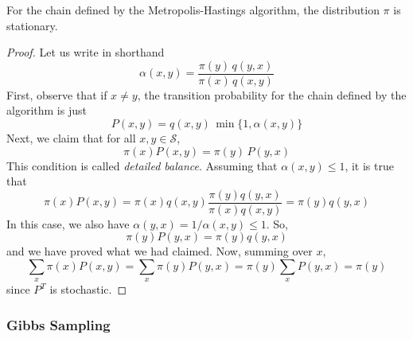 \documentclass{article}
\begin{document}
      \begin{proposition}
        For the chain defined by the Metropolis-Hastings algorithm, the distribution $\pi$ is stationary. 
      \end{proposition}
      \begin{proof}
        Let us write in shorthand 
        \begin{equation}
          \alpha(x, y) = \frac{\pi(y)\, q(y, x)}{\pi(x)\, q(x, y)}
        \end{equation}
        First, observe that if $x \neq y$, the transition probability for the chain defined by the algorithm is just
        \begin{equation}
          P(x, y) = q(x, y)\, \min\{1, \alpha(x, y)\}
        \end{equation}
        Next, we claim that for all $x, y \in \mathcal{S}$, 
        \begin{equation}
          \pi(x) P(x, y) = \pi(y) \, P(y, x)
        \end{equation}
        This condition is called \textit{detailed balance}. Assuming that $\alpha(x, y) \leq 1$, it is true that
        \begin{equation}
          \pi(x) P(x, y) = \pi(x) q(x, y) \frac{\pi(y) q(y, x)}{\pi(x) q(x, y)} = \pi(y) q(y, x)
        \end{equation}
        In this case, we also have $\alpha(y, x) = 1 / \alpha(x, y) \leq 1$. So, 
        \begin{equation}
          \pi(y) P(y, x) = \pi(y) q(y, x)
        \end{equation}
        and we have proved what we had claimed. Now, summing over $x$,
        \begin{equation}
          \sum_x \pi(x) P(x, y) = \sum_x \pi(y) P(y, x) = \pi(y) \sum_x P(y, x) = \pi(y)
        \end{equation}
        since $P^T$ is stochastic. 
      \end{proof}

    \subsubsection{Gibbs Sampling}
\end{document}
